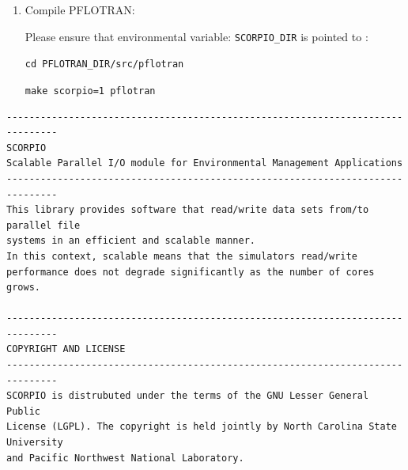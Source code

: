 {\begin{enumerate}
This assumes that you have let PETSc build MPI and {\tt mpicc} and {\tt mpif90} are located in \linebreak \verb|${PETSC_DIR}/${PETSC_ARCH}/bin|. If not, you may need to alter the {\tt Makefile} to provide the correct path to the location of the MPI compilers.

\footnotesize
{\tt cd DIRNAME/src}


{\tt make MACHINE=pflotran\_machine}

{\tt make install} \hfill {\it (compile with {\tt mpicc})}
\normalsize

This will build the library {\footnotesize\tt libscorpio.a} and copy corresponding files to {\footnotesize\tt SCORPIO\_DIR/lib} and {\footnotesize\tt SCORPIO\_DIR/include} directories.

On machines with MPI installed modify the makefile to use the native {\tt mpi} compilers:
\footnotesize
\begin{Verbatim}
ifeq ($(MACHINE),pflotran_machine)
  CC=mpicc
  FC=mpif90
  LINKER=${FC}
  CFLAGS+= -I${PETSC_DIR}/${PETSC_ARCH}/include -O3
  FFLAGS+= -I${PETSC_DIR}/${PETSC_ARCH}/include -O3 
  LDFLAGS+= -Wl,-L${PETSC_DIR}/${PETSC_ARCH}/lib -lhdf5 -lz 
endif
\end{Verbatim}
\normalsize

\item Compile PFLOTRAN:

Please ensure that environmental variable: {\footnotesize\tt SCORPIO\_DIR} is pointed to :

{\footnotesize\tt cd PFLOTRAN\_DIR/src/pflotran}

{\footnotesize\tt make scorpio=1 pflotran}
\normalsize
\end{enumerate}

\scriptsize
\begin{verbatim}
-------------------------------------------------------------------------------
SCORPIO
Scalable Parallel I/O module for Environmental Management Applications
-------------------------------------------------------------------------------
This library provides software that read/write data sets from/to parallel file 
systems in an efficient and scalable manner. 
In this context, scalable means that the simulators read/write 
performance does not degrade significantly as the number of cores grows.

-------------------------------------------------------------------------------
COPYRIGHT AND LICENSE 
-------------------------------------------------------------------------------
SCORPIO is distrubuted under the terms of the GNU Lesser General Public 
License (LGPL). The copyright is held jointly by North Carolina State University 
and Pacific Northwest National Laboratory. 


\end{verbatim}}
